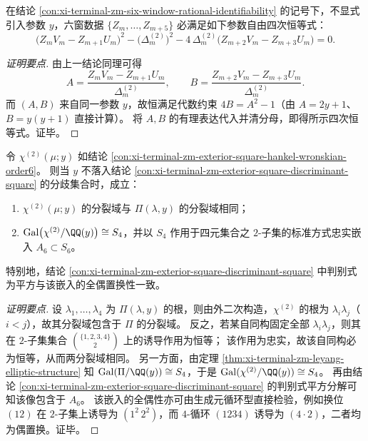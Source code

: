 \begin{conclusion}\label{con:xi-terminal-zm-six-window-parameter-free-quartic}
在结论 \ref{con:xi-terminal-zm-six-window-rational-identifiability} 的记号下，不显式引入参数 \(y\)，六窗数据 \(\{Z_m,\dots,Z_{m+5}\}\) 必满足如下参数自由四次恒等式：
\[
\boxed{\;
\bigl(Z_mV_m-Z_{m+1}U_m\bigr)^2-\bigl(\Delta^{(2)}_m\bigr)^2-4\,\Delta^{(2)}_m\bigl(Z_{m+2}V_m-Z_{m+3}U_m\bigr)=0.
\;}
\]
\end{conclusion}
\begin{proof}[证明要点]
由上一结论同理可得
\[
A=\frac{Z_mV_m-Z_{m+1}U_m}{\Delta^{(2)}_m},
\qquad
B=\frac{Z_{m+2}V_m-Z_{m+3}U_m}{\Delta^{(2)}_m}.
\]
而 \((A,B)\) 来自同一参数 \(y\)，故恒满足代数约束 \(4B=A^2-1\)（由 \(A=2y+1\)、\(B=y(y+1)\) 直接计算）。
将 \(A,B\) 的有理表达代入并清分母，即得所示四次恒等式。证毕。
\end{proof}

\begin{conclusion}[外二次六次多项式的伽罗瓦群刻画与信息完备性]\label{con:xi-terminal-zm-exterior-square-galois-s4}
令 \(\chi^{(2)}(\mu;y)\) 如结论 \ref{con:xi-terminal-zm-exterior-square-hankel-wronskian-order6}。
则当 \(y\) 不落入结论 \ref{con:xi-terminal-zm-exterior-square-discriminant-square} 的分歧集合时，成立：
\begin{enumerate}
  \item \(\chi^{(2)}(\mu;y)\) 的分裂域与 \(\Pi(\lambda,y)\) 的分裂域相同；
  \item \(\mathrm{Gal}\bigl(\chi^{(2)}/\QQ(y)\bigr)\cong S_4\)，并以 \(S_4\) 作用于四元集合之 \(2\)-子集的标准方式忠实嵌入 \(A_6\subset S_6\)。
\end{enumerate}
特别地，结论 \ref{con:xi-terminal-zm-exterior-square-discriminant-square} 中判别式为平方与该嵌入的全偶置换性一致。
\end{conclusion}
\begin{proof}[证明要点]
设 \(\lambda_1,\dots,\lambda_4\) 为 \(\Pi(\lambda,y)\) 的根，则由外二次构造，\(\chi^{(2)}\) 的根为 \(\lambda_i\lambda_j\)（\(i<j\)），故其分裂域包含于 \(\Pi\) 的分裂域。
反之，若某自同构固定全部 \(\lambda_i\lambda_j\)，则其在 \(2\)-子集集合 \(\binom{\{1,2,3,4\}}{2}\) 上的诱导作用为恒等；
该作用为忠实，故该自同构必为恒等，从而两分裂域相同。
另一方面，由定理 \ref{thm:xi-terminal-zm-leyang-elliptic-structure} 知 \(\mathrm{Gal}(\Pi/\QQ(y))\cong S_4\)，于是 \(\mathrm{Gal}(\chi^{(2)}/\QQ(y))\cong S_4\)。
再由结论 \ref{con:xi-terminal-zm-exterior-square-discriminant-square} 的判别式平方分解可知该像包含于 \(A_6\)。
该嵌入的全偶性亦可由生成元循环型直接检验，例如换位 \((12)\) 在 \(2\)-子集上诱导为 \((1^2\,2^2)\)，而 \(4\)-循环 \((1234)\) 诱导为 \((4\cdot 2)\)，二者均为偶置换。证毕。
\end{proof}


